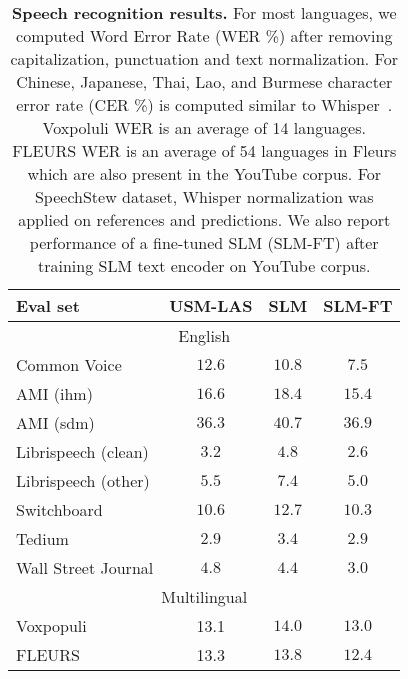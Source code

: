 \begin{table}[h]
    \centering
    \begin{tabular}{lccc}
    \toprule
        Eval set %
        & USM-LAS  & SLM & SLM-FT \\ \hline
            \midrule

        \multicolumn{4}{c}{English} \\
\hdashline
        Common Voice        %
        & $12.6$ & $10.8$ & $7.5$ \\
        AMI (ihm)           %
        & $16.6$ & $18.4$ & $15.4$ \\
        AMI (sdm)           %
        & $36.3$ & $40.7$ & $36.9$\\
        Librispeech (clean) %
        & $3.2$  &  $4.8$ & $2.6$\\
        Librispeech (other) %
        & $5.5$  &  $7.4$ & $5.0$ \\
        Switchboard        %
        & $10.6$ & $12.7$ & $10.3$ \\
        Tedium              %
        &  $2.9$ &  $3.4$ & $2.9$ \\
        Wall Street Journal %
        &  $4.8$ &  $4.4$ & $3.0$ \\
            \midrule
        \multicolumn{4}{c}{Multilingual} \\
            \hdashline
        Voxpopuli  & 13.1 &$14.0$ & $13.0$ \\
        FLEURS &13.3 & $13.8$ & $12.4$ \\
\bottomrule
    \end{tabular}
    \caption{\textbf{Speech recognition results.} For most languages, we computed Word Error Rate (WER \%) after removing capitalization, punctuation and text normalization. For Chinese, Japanese, Thai, Lao, and Burmese character error rate (CER \%) is computed similar to Whisper~\cite{radford2023robust}. Voxpoluli WER is an average of 14 languages. FLEURS WER is an average of 54 languages in Fleurs which are also present in the YouTube corpus. For SpeechStew dataset, Whisper normalization was applied on references and predictions. We also report performance of a fine-tuned SLM (SLM-FT) after training SLM text encoder on YouTube corpus.}
    \label{tab:asr_results}
\vspace{-.1in}
    
\end{table}

